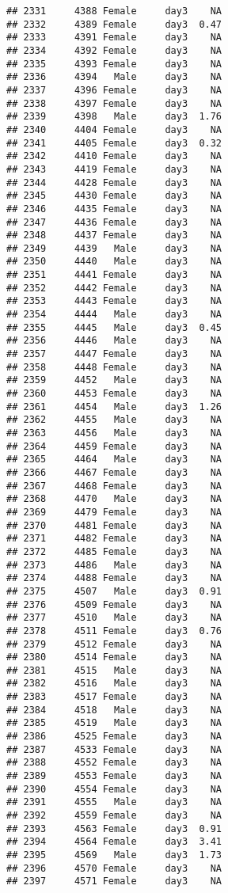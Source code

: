 \documentclass[
]{article}
\begin{document}
\begin{verbatim}
## 2331     4388 Female     day3    NA
## 2332     4389 Female     day3  0.47
## 2333     4391 Female     day3    NA
## 2334     4392 Female     day3    NA
## 2335     4393 Female     day3    NA
## 2336     4394   Male     day3    NA
## 2337     4396 Female     day3    NA
## 2338     4397 Female     day3    NA
## 2339     4398   Male     day3  1.76
## 2340     4404 Female     day3    NA
## 2341     4405 Female     day3  0.32
## 2342     4410 Female     day3    NA
## 2343     4419 Female     day3    NA
## 2344     4428 Female     day3    NA
## 2345     4430 Female     day3    NA
## 2346     4435 Female     day3    NA
## 2347     4436 Female     day3    NA
## 2348     4437 Female     day3    NA
## 2349     4439   Male     day3    NA
## 2350     4440   Male     day3    NA
## 2351     4441 Female     day3    NA
## 2352     4442 Female     day3    NA
## 2353     4443 Female     day3    NA
## 2354     4444   Male     day3    NA
## 2355     4445   Male     day3  0.45
## 2356     4446   Male     day3    NA
## 2357     4447 Female     day3    NA
## 2358     4448 Female     day3    NA
## 2359     4452   Male     day3    NA
## 2360     4453 Female     day3    NA
## 2361     4454   Male     day3  1.26
## 2362     4455   Male     day3    NA
## 2363     4456   Male     day3    NA
## 2364     4459 Female     day3    NA
## 2365     4464   Male     day3    NA
## 2366     4467 Female     day3    NA
## 2367     4468 Female     day3    NA
## 2368     4470   Male     day3    NA
## 2369     4479 Female     day3    NA
## 2370     4481 Female     day3    NA
## 2371     4482 Female     day3    NA
## 2372     4485 Female     day3    NA
## 2373     4486   Male     day3    NA
## 2374     4488 Female     day3    NA
## 2375     4507   Male     day3  0.91
## 2376     4509 Female     day3    NA
## 2377     4510   Male     day3    NA
## 2378     4511 Female     day3  0.76
## 2379     4512 Female     day3    NA
## 2380     4514 Female     day3    NA
## 2381     4515   Male     day3    NA
## 2382     4516   Male     day3    NA
## 2383     4517 Female     day3    NA
## 2384     4518   Male     day3    NA
## 2385     4519   Male     day3    NA
## 2386     4525 Female     day3    NA
## 2387     4533 Female     day3    NA
## 2388     4552 Female     day3    NA
## 2389     4553 Female     day3    NA
## 2390     4554 Female     day3    NA
## 2391     4555   Male     day3    NA
## 2392     4559 Female     day3    NA
## 2393     4563 Female     day3  0.91
## 2394     4564 Female     day3  3.41
## 2395     4569   Male     day3  1.73
## 2396     4570 Female     day3    NA
## 2397     4571 Female     day3    NA

\end{verbatim}
\end{document}
